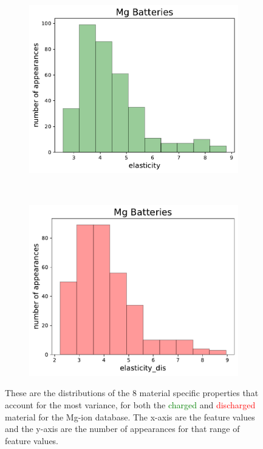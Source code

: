 \begin{figure}[h]
\begin{subfigure}{0.2\textwidth}
     \end{subfigure}
                   ~ 
               \begin{subfigure}{0.2\textwidth}
         \centering
         \includegraphics[width=\linewidth]{result/figures/distribution/columnsplotMg2_elasticity.pdf}
         
     \end{subfigure}
          ~ 
     \begin{subfigure}{0.2\textwidth}
         \centering
         \includegraphics[width=\linewidth]{result/figures/distribution/columnsplotMg_elasticity_dis.pdf}
         
     \end{subfigure}
     \caption{These are the distributions of the $8$ material specific properties that account for the most variance, for both the \textcolor{green}{charged} and \textcolor{red}{discharged} material for the Mg-ion database. The x-axis are the feature values and the y-axis are the number of appearances for that range of feature values.}
     \label{fig:Mg_msp_distribution}
 \end{figure}
